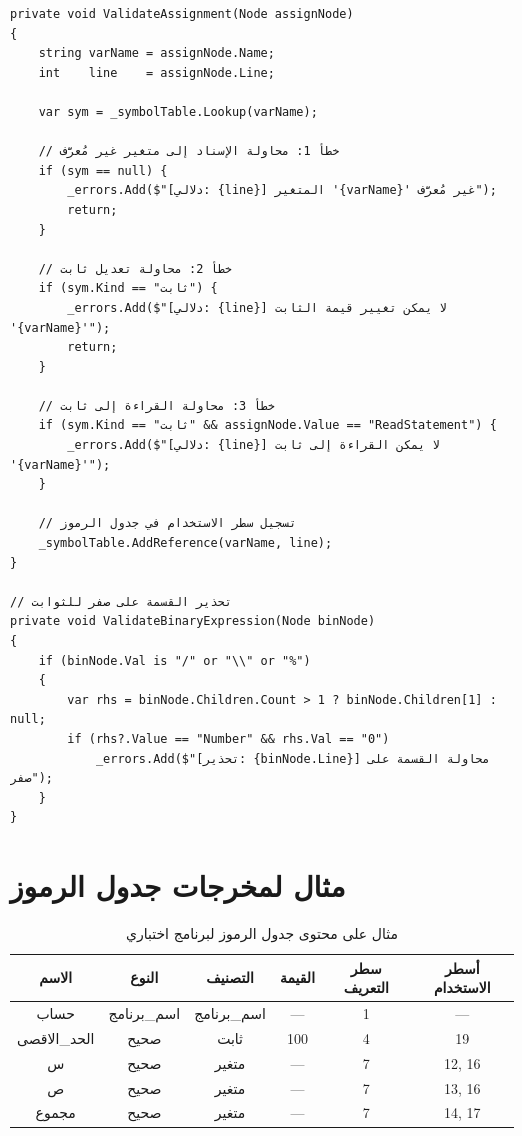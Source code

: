 \documentclass[12pt,a4paper]{report}
\newcommand{\filename}[1]{\textcolor{SecondaryBlue}{\texttt{#1}}}
\begin{document}
\begin{CodeBox}[title={\filename{SemanticAnalyzer.cs} — فحص الاستخدام والإسناد}]
\begin{lstlisting}[style=CSharpStyle]
private void ValidateAssignment(Node assignNode)
{
    string varName = assignNode.Name;
    int    line    = assignNode.Line;

    var sym = _symbolTable.Lookup(varName);

    // خطأ 1: محاولة الإسناد إلى متغير غير مُعرَّف
    if (sym == null) {
        _errors.Add($"[دلالي: {line}] المتغير '{varName}' غير مُعرَّف");
        return;
    }

    // خطأ 2: محاولة تعديل ثابت
    if (sym.Kind == "ثابت") {
        _errors.Add($"[دلالي: {line}] لا يمكن تغيير قيمة الثابت '{varName}'");
        return;
    }

    // خطأ 3: محاولة القراءة إلى ثابت
    if (sym.Kind == "ثابت" && assignNode.Value == "ReadStatement") {
        _errors.Add($"[دلالي: {line}] لا يمكن القراءة إلى ثابت '{varName}'");
    }

    // تسجيل سطر الاستخدام في جدول الرموز
    _symbolTable.AddReference(varName, line);
}

// تحذير القسمة على صفر للثوابت
private void ValidateBinaryExpression(Node binNode)
{
    if (binNode.Val is "/" or "\\" or "%")
    {
        var rhs = binNode.Children.Count > 1 ? binNode.Children[1] : null;
        if (rhs?.Value == "Number" && rhs.Val == "0")
            _errors.Add($"[تحذير: {binNode.Line}] محاولة القسمة على صفر");
    }
}
\end{lstlisting}
\end{CodeBox}

\section{مثال لمخرجات جدول الرموز}

\begin{table}[H]
\caption{\arabicfont مثال على محتوى جدول الرموز لبرنامج اختباري}
\label{tab:symtable-example}
\centering
\small
\begin{tabular}{|c|c|c|c|c|c|}
\hline
\rowcolor{TableHead}
\textbf{\arabicfont الاسم} & \textbf{\arabicfont النوع} & \textbf{\arabicfont التصنيف} & \textbf{\arabicfont القيمة} & \textbf{\arabicfont سطر التعريف} & \textbf{\arabicfont أسطر الاستخدام} \\
\hline
\arabicfont حساب & \arabicfont اسم\_برنامج & \arabicfont اسم\_برنامج & — & 1 & — \\
\hline
\rowcolor{TableAlt}
\arabicfont الحد\_الاقصى & \arabicfont صحيح & \arabicfont ثابت & 100 & 4 & 19 \\
\hline
\arabicfont س & \arabicfont صحيح & \arabicfont متغير & — & 7 & 12, 16 \\
\hline
\rowcolor{TableAlt}
\arabicfont ص & \arabicfont صحيح & \arabicfont متغير & — & 7 & 13, 16 \\
\hline
\arabicfont مجموع & \arabicfont صحيح & \arabicfont متغير & — & 7 & 14, 17 \\
\hline
\end{tabular}
\end{table}
\end{document}
